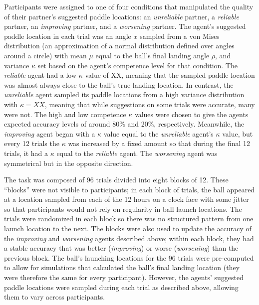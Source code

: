 \documentclass[10pt,letterpaper]{article}
\begin{document}

Participants were assigned to one of four conditions that manipulated the quality of their partner's suggested paddle locations: an \textit{unreliable} partner, a \textit{reliable} partner, an \textit{improving} partner, and a \textit{worsening} partner. The agent's
suggested paddle location in each trial was an angle $x$ sampled from a von Mises distribution (an approximation of a normal distribution defined over angles around a circle) with mean $\mu$ equal to the ball's final landing angle $\rho$, and variance $\kappa$ set based on the agent's competence level for that condition. The \textit{reliable} agent had a low $\kappa$ value of XX, meaning that the sampled paddle location was almost always close to the ball's true landing location. In contrast, the \textit{unreliable} agent sampled its paddle locations from a high variance distribution with $\kappa = XX$, meaning that while suggestions on some trials were accurate, many were not. The high and low competence $\kappa$ values were chosen to give the agents expected accuracy levels of around 80\% and 20\%, respectively. Meanwhile, the \textit{improving} agent began with a $\kappa$ value equal to the \textit{unreliable} agent's $\kappa$ value, but every 12 trials the $\kappa$ was increased by a fixed amount so that during the final 12 trials, it had a $\kappa$ equal to the \textit{reliable} agent. The \textit{worsening} agent was symmetrical but in the opposite direction.

The task was composed of 96 trials divided into eight blocks of 12. These ``blocks'' were not visible to participants; in each block of trials, the ball appeared at a location sampled from each of the 12 hours on a clock face with some jitter so that participants would not rely on regularity in ball launch locations. The trials were randomized in each block so there was no structured pattern from one launch location to the next. The blocks were also used to update the accuracy of the \textit{improving} and \textit{worsening} agents described above; within each block, they had a stable accuracy that was better (\textit{improving}) or worse (\textit{worsening}) than the previous block. The ball's launching locations for the 96 trials were pre-computed to allow for simulations that calculated the ball's final landing location (they were therefore the same for every participant). However, the agents' suggested paddle locations were sampled during each trial as described above, allowing them to vary across participants. 
\end{document}
